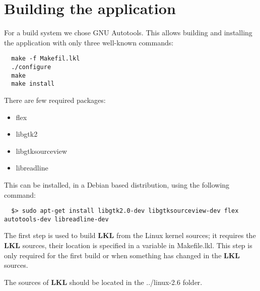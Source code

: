 \chapter{Building the application}

For a build system we chose GNU Autotools. This allows building
and installing the application with only three well-known commands:

\lstset{language=bash,caption=Build System,label=lst:building}
\begin{lstlisting}
  make -f Makefil.lkl
  ./configure
  make
  make install
\end{lstlisting}

There are few required packages:
\begin{itemize}
  \item flex
  \item libgtk2
  \item libgtksourceview
  \item libreadline
\end{itemize}

This can be installed, in a Debian based distribution, using the following 
command:
\lstset{language=zsh,caption=Required packages,label=lst:bpacakges}
\begin{lstlisting}
  $> sudo apt-get install libgtk2.0-dev libgtksourceview-dev flex autotools-dev libreadline-dev
\end{lstlisting}

The first step is used to build \textbf{LKL} from the Linux kernel sources; it
requires the \textbf{LKL} sources, their location is specified in a variable in
Makefile.lkl. This step is only required for the first build or
when something has changed in the \textbf{LKL} sources.

The sources of \textbf{LKL} should be located in the ../linux-2.6 folder.
